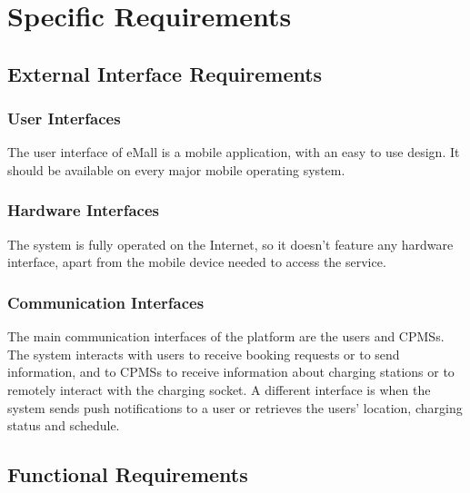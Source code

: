 \section{Specific Requirements}
\subsection{External Interface Requirements}
\subsubsection{User Interfaces}
The user interface of eMall is a mobile application, with an easy to use design.
It should be available on every major mobile operating system.
\subsubsection{Hardware Interfaces}
The system is fully operated on the Internet, so it doesn't feature any hardware interface, apart from the mobile device needed to access the service.
\subsubsection{Communication Interfaces}
The main communication interfaces of the platform are the users and CPMSs.
The system interacts with users to receive booking requests or to send information, and to CPMSs to receive information about charging stations or to remotely interact with the charging socket.
A different interface is when the system sends push notifications to a user or retrieves the users' location, charging status and schedule.
\subsection{Functional Requirements}
